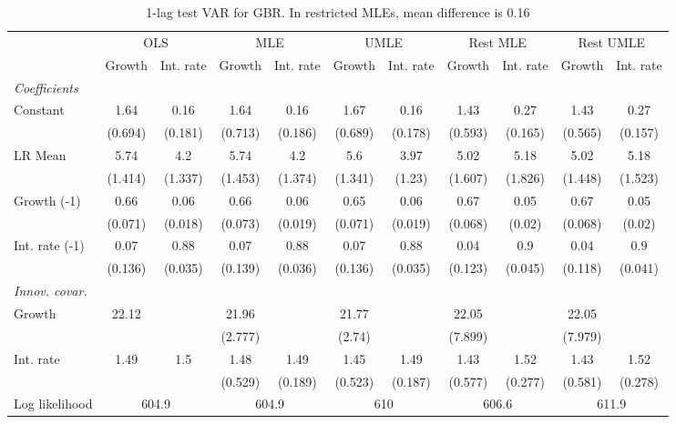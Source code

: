 \begin{table}[htbp] 
	\centering
	\begin{tabular}{@{\extracolsep{4pt}}lcccccccccc@{}}		\hline\hline
		 		 & \multicolumn{2}{c}{OLS} &\multicolumn{2}{c}{MLE} &\multicolumn{2}{c}{UMLE} &\multicolumn{2}{c}{Rest MLE} &\multicolumn{2}{c}{Rest UMLE} \\ 
 		 & Growth 	 & Int. rate 	 & Growth 	 & Int. rate 	 & Growth 	 & Int. rate 	 & Growth 	 & Int. rate 	 & Growth 	 & Int. rate\\\cline{2-3}\cline{4-5}\cline{6-7}\cline{8-9}\cline{10-11}
\rule{0pt}{4ex} 
 \emph{Coefficients} 	  		 & 		 & 		 & 		 & 		 & 		 & 		 & 		 & 		 & 		 &\\ 
\quad Constant 	 & 1.64 	 & 0.16 	 & 1.64 	 & 0.16 	 & 1.67 	 & 0.16 	 & 1.43 	 & 0.27 	 & 1.43 	 & 0.27	 \\ 
 		 & (0.694) 	 & (0.181) 	 & (0.713) 	 & (0.186) 	 & (0.689) 	 & (0.178) 	 & (0.593) 	 & (0.165) 	 & (0.565) 	 & (0.157) 	 \\ 
\quad LR Mean 	 & 5.74 	 & 4.2 	 & 5.74 	 & 4.2 	 & 5.6 	 & 3.97 	 & 5.02 	 & 5.18 	 & 5.02 	 & 5.18	 \\ 
 		 & (1.414) 	 & (1.337) 	 & (1.453) 	 & (1.374) 	 & (1.341) 	 & (1.23) 	 & (1.607) 	 & (1.826) 	 & (1.448) 	 & (1.523) 	 \\ 
\quad Growth (-1) 	 &0.66 	 & 0.06 	 & 0.66 	 & 0.06 	 & 0.65 	 & 0.06 	 & 0.67 	 & 0.05 	 & 0.67 	 & 0.05	 \\ 
 		 & (0.071) 	 & (0.018) 	 & (0.073) 	 & (0.019) 	 & (0.071) 	 & (0.019) 	 & (0.068) 	 & (0.02) 	 & (0.068) 	 & (0.02) 	 \\ 
\quad Int. rate (-1) 	 &0.07 	 & 0.88 	 & 0.07 	 & 0.88 	 & 0.07 	 & 0.88 	 & 0.04 	 & 0.9 	 & 0.04 	 & 0.9	 \\ 
 		 & (0.136) 	 & (0.035) 	 & (0.139) 	 & (0.036) 	 & (0.136) 	 & (0.035) 	 & (0.123) 	 & (0.045) 	 & (0.118) 	 & (0.041) 	 \\ 
\rule{0pt}{4ex} \emph{Innov. covar.}  	 & 	 & 	 & 	 & 	 & 	 & 	 & 	 & 	 & 	 &\\ 
\quad Growth 	 &22.12 	 &  	 & 21.96 	 &  	 & 21.77 	 &  	 & 22.05 	 &  	 & 22.05 	 & 	 \\ 
 		 &  	 &  	 & (2.777) 	 &  	 & (2.74) 	 &  	 & (7.899) 	 &  	 & (7.979) 	 &  	 \\ 
\quad Int. rate 	 &1.49 	 & 1.5 	 & 1.48 	 & 1.49 	 & 1.45 	 & 1.49 	 & 1.43 	 & 1.52 	 & 1.43 	 & 1.52	 \\ 
 		 &  	 &  	 & (0.529) 	 & (0.189) 	 & (0.523) 	 & (0.187) 	 & (0.577) 	 & (0.277) 	 & (0.581) 	 & (0.278) 	 \\ 
 \hline \rule{0pt}{4ex} 
  Log likelihood 	 &\multicolumn{2}{c}{604.9} 	 & \multicolumn{2}{c}{604.9} 	 & \multicolumn{2}{c}{610} 	 & \multicolumn{2}{c}{606.6} 	 & \multicolumn{2}{c}{611.9}\\ 

 \hline 	\end{tabular}		\caption{1-lag test VAR for GBR. In restricted MLEs, mean difference is 0.16}
		\label{tab:GBR1}

\end{table}